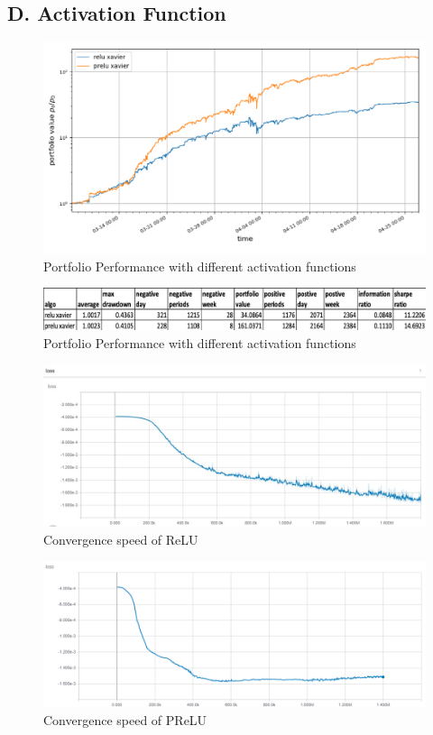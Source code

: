 \documentclass[11pt]{paper}
\begin{document}
	\subsection*{D. Activation Function}
			\begin{figure}[H]
			\centering  
			\includegraphics[width=0.7\linewidth]{activation.png} 
			\caption{Portfolio Performance with different activation functions} 
		\end{figure}
		\begin{figure}[H]%
			\centering  
			\includegraphics[width=1\linewidth]{activation2.png} 
			\caption{Portfolio Performance with different activation functions} 
		\end{figure}
			\begin{figure}[H]
			\centering 
			\includegraphics[width=0.7\linewidth]{initialization1.png} 
			\caption{Convergence speed of ReLU}
			\label{fig:cnn} 
		\end{figure}
		\begin{figure}[H]
			\centering  
			\includegraphics[width=0.7\linewidth]{prelu.png} 
			\caption{Convergence speed of PReLU} 
			\label{fig:cnn} 
		\end{figure}



	
	





	











\end{document}
